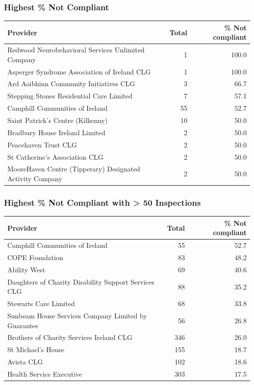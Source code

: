 \documentclass[a4paper,11pt,twoside]{article}
\begin{document}
\subsubsection{Highest \% Not Compliant}
\label{sec:org56951d3}

\begin{center}
\begin{tabular}{lrr}
Provider & Total & \% Not compliant\\[0pt]
\hline
Redwood Neurobehavioral Services Unlimited Company & 1 & 100.0\\[0pt]
Asperger Syndrome Association of Ireland CLG & 1 & 100.0\\[0pt]
Ard Aoibhinn Community Initiatives CLG & 3 & 66.7\\[0pt]
Stepping Stones Residential Care Limited & 7 & 57.1\\[0pt]
Camphill Communities of Ireland & 55 & 52.7\\[0pt]
Saint Patrick's Centre (Kilkenny) & 10 & 50.0\\[0pt]
Bradbury House Ireland Limited & 2 & 50.0\\[0pt]
Peacehaven Trust CLG & 2 & 50.0\\[0pt]
St Catherine's Association CLG & 2 & 50.0\\[0pt]
MooreHaven Centre (Tipperary) Designated Activity Company & 2 & 50.0\\[0pt]
\end{tabular}
\end{center}
\subsubsection{Highest \% Not Compliant with > 50 Inspections}
\label{sec:org3093a9c}

\begin{center}
\begin{tabular}{lrr}
Provider & Total & \% Not compliant\\[0pt]
\hline
Camphill Communities of Ireland & 55 & 52.7\\[0pt]
COPE Foundation & 83 & 48.2\\[0pt]
Ability West & 69 & 40.6\\[0pt]
Daughters of Charity Disability Support Services CLG & 88 & 35.2\\[0pt]
Stewarts Care Limited & 68 & 33.8\\[0pt]
Sunbeam House Services Company Limited by Guarantee & 56 & 26.8\\[0pt]
Brothers of Charity Services Ireland CLG & 346 & 26.0\\[0pt]
St Michael's House & 155 & 18.7\\[0pt]
Avista CLG & 102 & 18.6\\[0pt]
Health Service Executive & 303 & 17.5\\[0pt]
\end{tabular}
\end{center}
\end{document}
